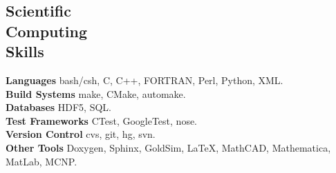 \documentclass[margin,line]{resume}
\begin{document}
\begin{resume}
    \section{\mysidestyle Scientific\\Computing\\Skills} 
                \textbf{Languages} \hfill bash/csh, C, C++, FORTRAN, Perl, Python, XML.\vspace{.5mm}\\%
                \textbf{Build Systems} \hfill make, CMake, automake.\vspace{.5mm}\\%
                \textbf{Databases} \hfill HDF5, SQL.\vspace{.5mm}\\%
                \textbf{Test Frameworks} \hfill CTest, GoogleTest, nose.\vspace{.5mm}\\%
                \textbf{Version Control} \hfill cvs, git, hg, svn.\vspace{.5mm}\\%
                \textbf{Other Tools} \hfill Doxygen, Sphinx, GoldSim, \LaTeX, MathCAD, Mathematica, MatLab, MCNP.\vspace{.5mm}\\%


\end{resume}
\end{document}
